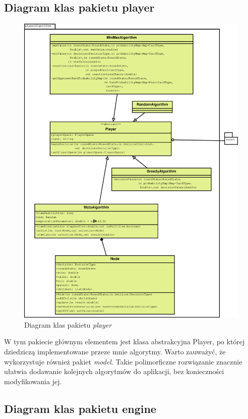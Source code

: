 \subsection{Diagram klas pakietu player}

\begin{figure}[H]
	\centering
	\includegraphics[width=\textwidth]{Resources/diagramKlas_player.eps}
	\caption{Diagram klas pakietu \textit{player}} 
	\label{fig:diagramKlasPlayer}
\end{figure}

W tym pakiecie głównym elementem jest klasa abstrakcyjna Player, po której dziedziczą implementowane przeze mnie algorytmy. Warto zauważyć, że wykorzystuje również pakiet \textit{model}. Takie polimorficzne rozwiązanie znacznie ułatwia dodawanie kolejnych algorytmów do aplikacji, bez konieczności modyfikowania jej.

\subsection{Diagram klas pakietu engine}

